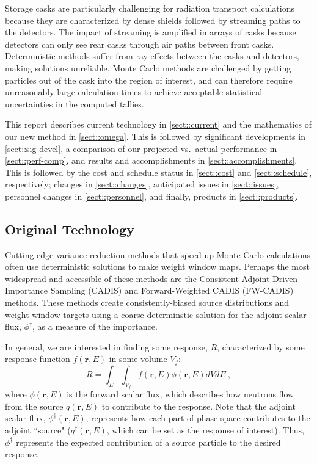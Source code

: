 \documentclass[12pt]{article}
\newcommand{\ve}[1]{\ensuremath{\mathbf{#1}}}
\begin{document}
Storage casks are particularly challenging for radiation transport calculations because they are characterized by dense shields followed by streaming paths to the detectors. 
The impact of streaming is amplified in arrays of casks because detectors can only see rear casks through air paths between front casks. 
Deterministic methods suffer from ray effects between the casks and detectors, making solutions unreliable. 
Monte Carlo methods are challenged by getting particles out of the cask into the region of interest, and can therefore require unreasonably large calculation times to achieve acceptable statistical uncertainties in the computed tallies.

This report describes current technology in \autoref{sect::current} and the mathematics of our new method in \autoref{sect::omega}. This is followed by significant developments in \autoref{sect::sig-devel}, a comparison of our projected vs.\ actual performance in \autoref{sect::perf-comp}, and results and accomplishments in \autoref{sect::accomplishments}. This is followed by the cost and schedule status in \autoref{sect::cost} and \autoref{sect::schedule}, respectively; changes in \autoref{sect::changes}, anticipated issues in \autoref{sect::issues}, personnel changes in \autoref{sect::personnel}, and finally, products in \autoref{sect::products}.  

\subsection{Original Technology}
\label{sect::current}
Cutting-edge variance reduction methods that speed up Monte Carlo calculations often use deterministic solutions to make weight window maps. 
Perhaps the most widespread and accessible of these methods are the Consistent Adjoint Driven Importance Sampling (CADIS) \cite{wagner_automatic_1997,wagner_automated_1998,haghighat_monte_2003} and Forward-Weighted CADIS (FW-CADIS) \cite{wagner_forward-weighted_2007,wagner_forward-weighted_2009,wagner_forward-weighted_2010} methods. 
These methods create consistently-biased source distributions and weight window targets using a coarse determinstic solution for the adjoint scalar flux, $\phi^{\dagger}$, as a measure of the importance. 

In general, we are interested in finding some response, $R$, characterized by some response function $f(\ve{r}, E)$ in some volume $V_f$:
%
\begin{equation}
 R = \int_E \int_{V_f} f(\ve{r}, E) \phi(\ve{r}, E) dV dE \:,
 \label{eq:Response}
\end{equation}
where $\phi(\ve{r}, E)$ is the forward scalar flux, which describes how neutrons flow from the source $q(\ve{r}, E)$ to contribute to the response. 
Note that the adjoint scalar flux, $\phi^{\dagger}(\ve{r}, E)$, represents how each part of phase space contributes to the adjoint ``source" ($q^{\dagger}(\ve{r}, E)$, which can be set as the response of interest). 
Thus, $\phi^{\dagger}$ represents the expected contribution of a source particle to the desired response.
 
\end{document}
